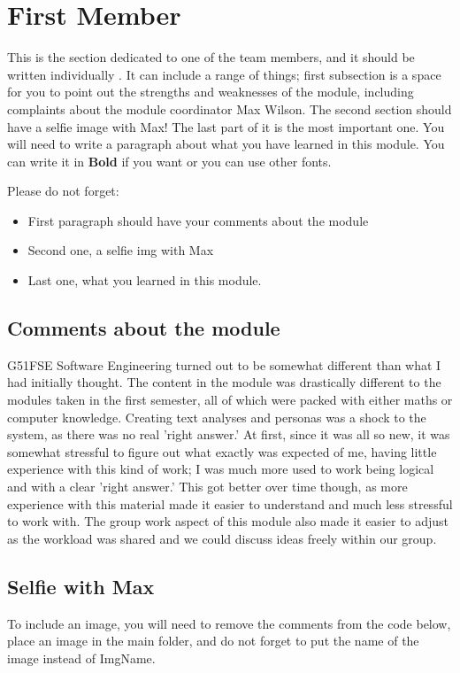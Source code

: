 \section{First Member}
This is the section dedicated to one of the team members, and it should be written individually . It can include a range of things; first subsection is a space for you to point out the strengths and weaknesses of the module, including complaints about the module coordinator Max Wilson. The second section should have a selfie image with Max! The last part of it is the most important one. You will need to write a paragraph about what you have learned in this module. You can write it in \textbf{Bold} if you want or you can use other fonts. 

Please do not forget:
\begin{itemize}
	\item First paragraph should have your comments about the module
	\item Second one, a selfie img with Max
	\item Last one, what you learned in this module.
\end{itemize}

\subsection{Comments about the module}
G51FSE Software Engineering turned out to be somewhat different than what I had initially thought. The content in the module was drastically different to the modules taken in the first semester, all of which were packed with either maths or computer knowledge. Creating text analyses and personas was a shock to the system, as there was no real 'right answer.' At first, since it was all so new, it was somewhat stressful to figure out what exactly was expected of me, having little experience with this kind of work; I was much more used to work being logical and with a clear 'right answer.' This got better over time though, as more experience with this material made it easier to understand and much less stressful to work with. The group work aspect of this module also made it easier to adjust as the workload was shared and we could discuss ideas freely within our group.

\subsection{Selfie with Max}

To include an image, you will need to remove the comments from the code below, place an image in the main folder, and do not forget to put the name of the image instead of ImgName. 


